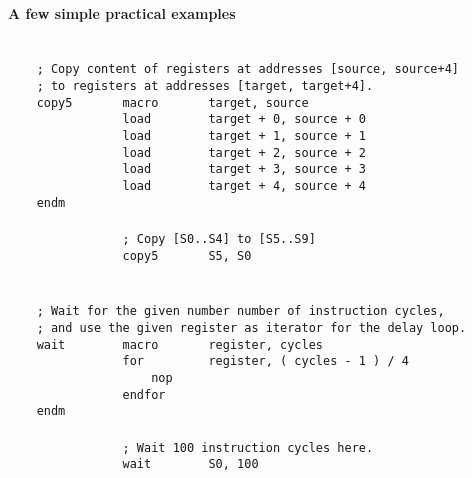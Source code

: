         \paragraph{A few simple practical examples}
            ~\\
            \verb'    ; Copy content of registers at addresses [source, source+4]'\\
            \verb'    ; to registers at addresses [target, target+4].'\\
            \verb'    copy5       macro       target, source'\\
            \verb'                load        target + 0, source + 0'\\
            \verb'                load        target + 1, source + 1'\\
            \verb'                load        target + 2, source + 2'\\
            \verb'                load        target + 3, source + 3'\\
            \verb'                load        target + 4, source + 4'\\
            \verb'    endm'\\
            \verb''\\
            \verb'                ; Copy [S0..S4] to [S5..S9]'\\
            \verb'                copy5       S5, S0'\\
            \verb''\\
            \verb''\\
            \verb'    ; Wait for the given number number of instruction cycles,'\\
            \verb'    ; and use the given register as iterator for the delay loop.'\\
            \verb'    wait        macro       register, cycles'\\
            \verb'                for         register, ( cycles - 1 ) / 4'\\
            \verb'                    nop'\\
            \verb'                endfor'\\
            \verb'    endm'\\
            \verb''\\
            \verb'                ; Wait 100 instruction cycles here.'\\
            \verb'                wait        S0, 100'
